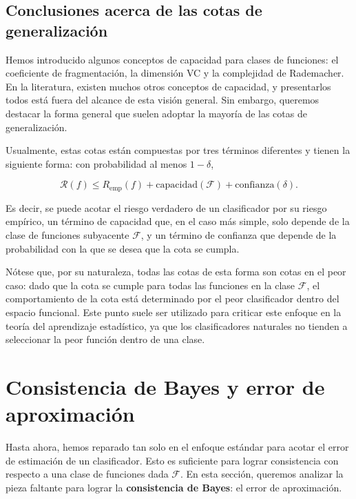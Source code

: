 \documentclass{report}
\begin{document}
\subsection{Conclusiones acerca de las cotas de generalización}

Hemos introducido algunos conceptos de capacidad para clases de funciones: el 
coeficiente de fragmentación, la dimensión VC y la complejidad de Rademacher. En la literatura, 
existen muchos otros conceptos de capacidad, y presentarlos todos está fuera del alcance de esta 
visión general. Sin embargo, queremos destacar la forma general que suelen adoptar la mayoría 
de las cotas de generalización.\newline

Usualmente, estas cotas están compuestas por tres términos diferentes y tienen la siguiente forma: 
con probabilidad al menos \(1 - \delta\),

\[
\mathcal{R}(f) \leq R_{\text{emp}}(f) + \text{capacidad}(\mathcal{F}) + \text{confianza}(\delta).
\]

Es decir, se puede acotar el riesgo verdadero de un clasificador por su riesgo empírico, un término 
de capacidad que, en el caso más simple, solo depende de la clase de funciones subyacente 
\(\mathcal{F}\), y un término de confianza que depende de la probabilidad con la que se desea que 
la cota se cumpla.\newline

Nótese que, por su naturaleza, todas las cotas de esta forma son cotas en el peor caso: dado que 
la cota se cumple para todas las funciones en la clase \(\mathcal{F}\), el comportamiento de la cota 
está determinado por el peor clasificador dentro del espacio funcional. Este punto suele ser 
utilizado para criticar este enfoque en la teoría del aprendizaje estadístico, ya que los clasificadores 
naturales no tienden a seleccionar la peor función dentro de una clase.\newline


\section{Consistencia de Bayes y error de aproximación}

Hasta ahora, hemos reparado tan solo en el enfoque estándar para acotar el error de estimación 
de un clasificador. Esto es suficiente para lograr consistencia con respecto a una clase de funciones 
dada \(\mathcal{F}\). En esta sección, queremos analizar la pieza faltante para lograr la 
\textbf{consistencia de Bayes}: el error de aproximación.\newline
\end{document}
